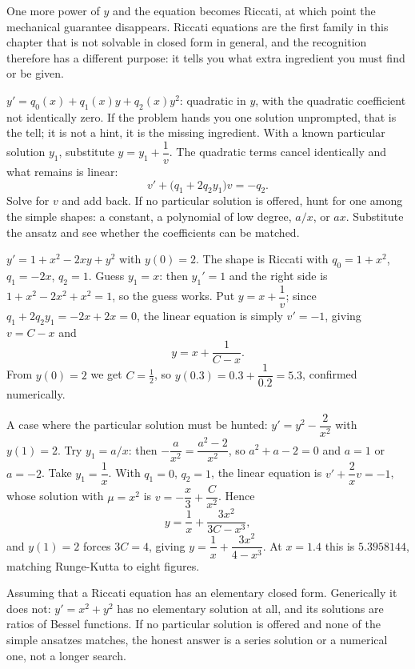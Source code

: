 One more power of $y$ and the equation becomes Riccati, at which point the mechanical guarantee disappears. Riccati equations are the first family in this chapter that is not solvable in closed form in general, and the recognition therefore has a different purpose: it tells you what extra ingredient you must find or be given.

\cue $y'=q_0(x)+q_1(x)y+q_2(x)y^{2}$: quadratic in $y$, with the quadratic coefficient not identically zero. If the problem hands you one solution unprompted, that is the tell; it is not a hint, it is the missing ingredient.
\method With a known particular solution $y_1$, substitute $y=y_1+\dfrac1v$. The quadratic terms cancel identically and what remains is linear:
\[v'+\bigl(q_1+2q_2y_1\bigr)v=-q_2.\]
Solve for $v$ and add back. If no particular solution is offered, hunt for one among the simple shapes: a constant, a polynomial of low degree, $a/x$, or $ax$. Substitute the ansatz and see whether the coefficients can be matched.

\begin{worked}
$y'=1+x^{2}-2xy+y^{2}$ with $y(0)=2$. The shape is Riccati with $q_0=1+x^{2}$, $q_1=-2x$, $q_2=1$. Guess $y_1=x$: then $y_1'=1$ and the right side is $1+x^{2}-2x^{2}+x^{2}=1$, so the guess works. Put $y=x+\dfrac1v$; since $q_1+2q_2y_1=-2x+2x=0$, the linear equation is simply $v'=-1$, giving $v=C-x$ and
\[y=x+\frac{1}{C-x}.\]
From $y(0)=2$ we get $C=\tfrac12$, so $y(0.3)=0.3+\dfrac{1}{0.2}=5.3$, confirmed numerically.

A case where the particular solution must be hunted: $y'=y^{2}-\dfrac{2}{x^{2}}$ with $y(1)=2$. Try $y_1=a/x$: then $-\dfrac{a}{x^{2}}=\dfrac{a^{2}-2}{x^{2}}$, so $a^{2}+a-2=0$ and $a=1$ or $a=-2$. Take $y_1=\dfrac1x$. With $q_1=0$, $q_2=1$, the linear equation is $v'+\dfrac{2}{x}v=-1$, whose solution with $\mu=x^{2}$ is $v=-\dfrac x3+\dfrac{C}{x^{2}}$. Hence
\[y=\frac1x+\frac{3x^{2}}{3C-x^{3}},\]
and $y(1)=2$ forces $3C=4$, giving $y=\dfrac1x+\dfrac{3x^{2}}{4-x^{3}}$. At $x=1.4$ this is $5.3958144$, matching Runge-Kutta to eight figures.
\end{worked}

\begin{trap}
Assuming that a Riccati equation has an elementary closed form. Generically it does not: $y'=x^{2}+y^{2}$ has no elementary solution at all, and its solutions are ratios of Bessel functions. If no particular solution is offered and none of the simple ansatzes matches, the honest answer is a series solution or a numerical one, not a longer search.
\end{trap}

